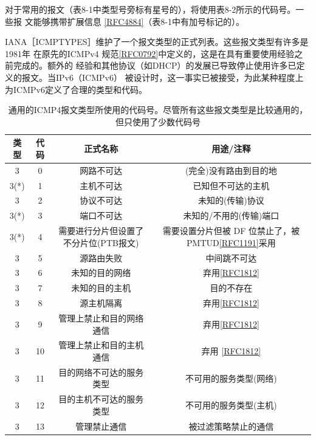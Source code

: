 对于常用的报文（表8-1中类型号旁标有星号的），将使用表8-2所示的代码号。一些报
文能够携带扩展信息 \href{https://www.rfc-editor.org/rfc/rfc4884}{[RFC4884]}（表8-1中有加号标记的）。

IANA［ICMPTYPES］维护了一个报文类型的正式列表。这些报文类型有许多是1981年
在原先的ICMPv4 规范\href{https://www.rfc-editor.org/rfc/rfc0792}{[RFC0792]}中定义的，这是在具有重要使用经验之前完成的。额外的
经验和其他协议（如DHCP）的发展已导致停止使用许多已定义的报文。当IPv6（ICMPv6）
被设计时，这一事实已被接受，为此某种程度上为ICMPv6定义了合理的类型和代码。

\begin{table}[H]
    \centering
    \caption{通用的ICMP4报文类型所使用的代码号。尽管所有这些报文类型是比较通用的，但只使用了少数代码号}
    \begin{tabular}{c|c|c|c}
        \hline
        类型	&	代码	&	正式名称  & 用途/注释	\\ \hline
		3		&	0	&	网路不可达	&	(完全)没有路由到目的地 \\ \hline
		3(*)	&	1	&	主机不可达	&	已知但不可达的主机 \\ \hline
		3		&	2	&	协议不可达	&	未知的(传输)协议 \\ \hline
		3(*)	&	3	&	端口不可达	&	未知的/不用的(传输)端口 \\ \hline
		3(*)	&	4	&	需要进行分片但设置了不分片位(PTB报文)	&	需要设置分片但被 DF 位禁止了，被 PMTUD\href{https://www.rfc-editor.org/rfc/rfc1191}{[RFC1191]}采用 \\ \hline
		3		&	5	&	源路由失败	&	中间跳不可达 \\ \hline
		3		&	6	&	未知的目的网络	&	弃用\href{https://www.rfc-editor.org/rfc/rfc1812}{[RFC1812]} \\ \hline
		3		&	7	&	未知的目的主机	&	目的不存在 \\ \hline
		3		&	8	&	源主机隔离	&	弃用\href{https://www.rfc-editor.org/rfc/rfc1812}{[RFC1812]} \\ \hline
		3		&	9	&	管理上禁止和目的网络通信	&	弃用\href{https://www.rfc-editor.org/rfc/rfc1812}{[RFC1812]} \\ \hline
		3		&	10	&	管理上禁止和目的主机通信	&	弃用 \href{https://www.rfc-editor.org/rfc/rfc1812}{[RFC1812]} \\ \hline
		3		&	11	&	目的网络不可达的服务类型	&	不可用的服务类型(网络) \\ \hline
		3		&	12	&	目的主机不可达的服务类型	&	不可用的服务类型(主机) \\ \hline
		3		&	13	&	管理禁止通信	&	被过滤策略禁止的通信 \\ \hline

\end{tabular}
\end{table}
